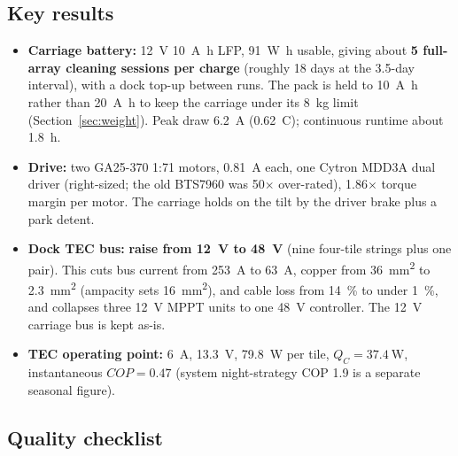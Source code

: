 \documentclass[11pt,a4paper]{article}
\begin{document}
\subsection{Key results}

\begin{itemize}
\item \textbf{Carriage battery:} \SI{12}{\volt} \SI{10}{\ampere\hour} LFP,
  \SI{91}{\watt\hour} usable, giving about \textbf{5 full-array cleaning
  sessions per charge} (roughly \num{18} days at the \num{3.5}-day interval),
  with a dock top-up between runs. The pack is held to \SI{10}{\ampere\hour}
  rather than \SI{20}{\ampere\hour} to keep the carriage under its
  \SI{8}{\kilo\gram} limit (Section~\ref{sec:weight}). Peak draw
  \SI{6.2}{\ampere} (\SI{0.62}{C}); continuous runtime about \SI{1.8}{\hour}.
\item \textbf{Drive:} two GA25-370 \num{1}:\num{71} motors, \SI{0.81}{\ampere}
  each, one Cytron MDD3A dual driver (right-sized; the old BTS7960 was
  \num{50}$\times$ over-rated), \num{1.86}$\times$ torque margin per motor. The
  carriage holds on the tilt by the driver brake plus a park detent.
\item \textbf{Dock TEC bus:} \textbf{raise from \SI{12}{\volt} to
  \SI{48}{\volt}} (nine four-tile strings plus one pair). This cuts bus current
  from \SI{253}{\ampere} to \SI{63}{\ampere}, copper from
  \SI{36}{\milli\meter\squared} to \SI{2.3}{\milli\meter\squared} (ampacity sets
  \SI{16}{\milli\meter\squared}), and cable loss from \SI{14}{\percent} to under
  \SI{1}{\percent}, and collapses three \SI{12}{\volt} MPPT units to one
  \SI{48}{\volt} controller. The \SI{12}{\volt} carriage bus is kept as-is.
\item \textbf{TEC operating point:} \SI{6}{\ampere}, \SI{13.3}{\volt},
  \SI{79.8}{\watt} per tile, $Q_C=\SI{37.4}{\watt}$, instantaneous
  $COP=\num{0.47}$ (system night-strategy COP \num{1.9} is a separate seasonal
  figure).
\end{itemize}

\subsection{Quality checklist}
\end{document}
